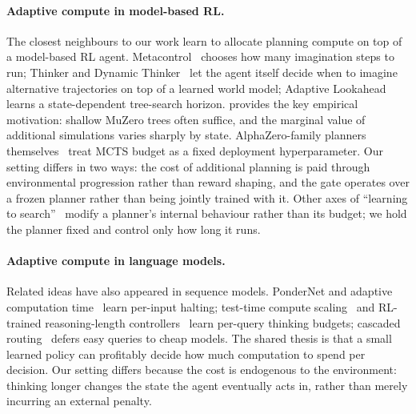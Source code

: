 \paragraph{Adaptive compute in model-based RL.}
The closest neighbours to our work learn to allocate planning compute on
top of a model-based RL agent.
Metacontrol~\citep{hamrick2017metacontrol} chooses how many imagination
steps to run; Thinker and Dynamic Thinker~\citep{chung2023thinker,
wang2024dynamic} let the agent itself decide when to imagine alternative
trajectories on top of a learned world model; Adaptive
Lookahead~\citep{dalal2022adaptive} learns a state-dependent tree-search
horizon.
\citet{hamrick2021role} provides the key empirical motivation:
shallow MuZero trees often suffice, and the marginal value of additional
simulations varies sharply by state.
AlphaZero-family planners themselves~\citep{silver2018general,
schrittwieser2020muzero,danihelka2022policy} treat MCTS budget as a
fixed deployment hyperparameter.
Our setting differs in two ways: the cost of additional planning is
paid through environmental progression rather than reward shaping, and
the gate operates over a frozen planner rather than being jointly
trained with it.
Other axes of ``learning to search''~\citep{guez2018mctsnets,
farquhar2018treeqn,hamrick2020save,racaniere2017i2a} modify a planner's
internal behaviour rather than its budget; we hold the planner fixed and
control only how long it runs.

\paragraph{Adaptive compute in language models.}
Related ideas have also appeared in sequence models.
PonderNet and adaptive computation time~\citep{graves2016act,
banino2021pondernet,schuster2022calm} learn per-input halting; test-time
compute scaling~\citep{snell2024scaling,deepseek2025r1,muennighoff2025s1}
and RL-trained reasoning-length controllers~\citep{aggarwal2025l1,
muppidi2025predictive,fang2025thinkless,shen2025dast} learn per-query
thinking budgets; cascaded routing~\citep{kim2023bigl,chen2023frugalgpt,
ong2025routellm} defers easy queries to cheap models.
The shared thesis is that a small learned policy can profitably decide
how much computation to spend per decision.
Our setting differs because the cost is endogenous to the environment:
thinking longer changes the state the agent eventually acts in, rather
than merely incurring an external penalty.


